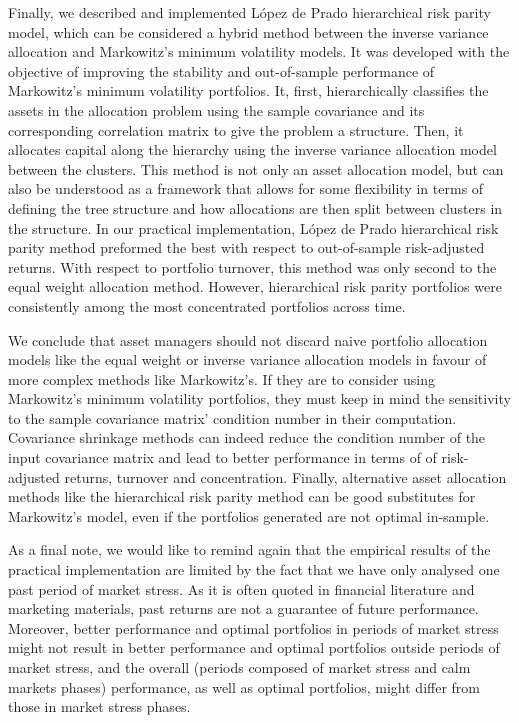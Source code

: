 Finally, we described and implemented López de Prado hierarchical risk parity model, which can be considered a hybrid method between the inverse variance allocation and Markowitz's minimum volatility models. It was developed with the objective of improving the stability and out-of-sample performance of Markowitz's minimum volatility portfolios. It, first, hierarchically classifies the assets in the allocation problem using the sample covariance and its corresponding correlation matrix to give the problem a structure. Then, it allocates capital along the hierarchy using the inverse variance allocation model between the clusters. This method is not only an asset allocation model, but can also be understood as a framework that allows for some flexibility in terms of defining the tree structure and how allocations are then split between clusters in the structure. In our practical implementation, López de Prado hierarchical risk parity method preformed the best with respect to out-of-sample risk-adjusted returns. With respect to portfolio turnover, this method was only second to the equal weight allocation method. However, hierarchical risk parity portfolios were consistently among the most concentrated portfolios across time.

We conclude that asset managers should not discard naive portfolio allocation models like the equal weight or inverse variance allocation models in favour of more complex methods like Markowitz's. If they are to consider using Markowitz's minimum volatility portfolios, they must keep in mind the sensitivity to the sample covariance matrix' condition number in their computation. Covariance shrinkage methods can indeed reduce the condition number of the input covariance matrix and lead to better performance in terms of of risk-adjusted returns, turnover and concentration. Finally, alternative asset allocation methods like the hierarchical risk parity method can be good substitutes for Markowitz's model, even if the portfolios generated are not optimal in-sample.

As a final note, we would like to remind again that the empirical results of the practical implementation are limited by the fact that we have only analysed one past period of market stress. As it is often quoted in financial literature and marketing materials, past returns are not a guarantee of future performance. Moreover, better performance and optimal portfolios in periods of market stress might not result in better performance and optimal portfolios outside periods of market stress, and the overall (periods composed of market stress and calm markets phases) performance, as well as optimal portfolios, might differ from those in market stress phases.